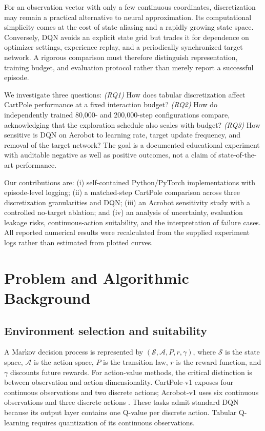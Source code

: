 \documentclass[conference,10pt]{IEEEtran}
\begin{document}
For an observation vector with only a few continuous coordinates, discretization may remain a practical alternative to neural approximation. Its computational simplicity comes at the cost of state aliasing and a rapidly growing state space. Conversely, DQN avoids an explicit state grid but trades it for dependence on optimizer settings, experience replay, and a periodically synchronized target network. A rigorous comparison must therefore distinguish representation, training budget, and evaluation protocol rather than merely report a successful episode.

We investigate three questions: \emph{(RQ1)} How does tabular discretization affect CartPole performance at a fixed interaction budget? \emph{(RQ2)} How do independently trained 80,000- and 200,000-step configurations compare, acknowledging that the exploration schedule also scales with budget? \emph{(RQ3)} How sensitive is DQN on Acrobot to learning rate, target update frequency, and removal of the target network? The goal is a documented educational experiment with auditable negative as well as positive outcomes, not a claim of state-of-the-art performance.

Our contributions are: (i) self-contained Python/PyTorch implementations with episode-level logging; (ii) a matched-step CartPole comparison across three discretization granularities and DQN; (iii) an Acrobot sensitivity study with a controlled no-target ablation; and (iv) an analysis of uncertainty, evaluation leakage risks, continuous-action suitability, and the interpretation of failure cases. All reported numerical results were recalculated from the supplied experiment logs rather than estimated from plotted curves.

\section{Problem and Algorithmic Background}
\subsection{Environment selection and suitability}
A Markov decision process is represented by $(\mathcal S,\mathcal A,P,r,\gamma)$, where $\mathcal S$ is the state space, $\mathcal A$ is the action space, $P$ is the transition law, $r$ is the reward function, and $\gamma$ discounts future rewards. For action-value methods, the critical distinction is between observation and action dimensionality. CartPole-v1 exposes four continuous observations and two discrete actions; Acrobot-v1 uses six continuous observations and three discrete actions \cite{GymnasiumDocs}. These tasks admit standard DQN because its output layer contains one Q-value per discrete action. Tabular Q-learning requires quantization of its continuous observations.
\end{document}
